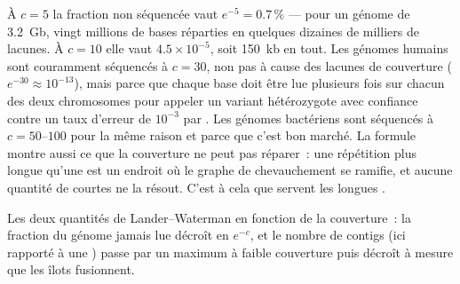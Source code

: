 \begin{example}\label{ex:b3:genomics:coverage}
À $c = 5$ la fraction non séquencée vaut $e^{-5} = 0.7\,\%$ --- pour un
génome de \qty{3.2}{Gb}, vingt millions de bases réparties en quelques
dizaines de milliers de lacunes. À $c = 10$ elle vaut
$4.5\times 10^{-5}$, soit \qty{150}{kb} en tout. Les génomes humains
sont couramment séquencés à $c = 30$, non pas à cause des lacunes de
couverture ($e^{-30} \approx 10^{-13}$), mais parce que chaque base
doit être lue plusieurs fois sur chacun des deux chromosomes pour
appeler un variant hétérozygote avec confiance contre un taux d'erreur
de $10^{-3}$ par . Les génomes bactériens sont séquencés à
$c = 50$--$100$ pour la même raison et parce que c'est bon marché. La
formule montre aussi ce que la couverture ne peut pas réparer~: une
répétition plus longue qu'une  est un endroit où le graphe de
chevauchement se ramifie, et aucune quantité de  courtes ne la
résout. C'est à cela que servent les longues .
\end{example}

\begin{omfigure}

{\small Les deux quantités de Lander--Waterman en fonction de la
couverture~: la fraction du génome jamais lue décroît en $e^{-c}$, et le
nombre de contigs (ici rapporté à une ) passe par un maximum à
faible couverture puis décroît à mesure que les îlots fusionnent.}
\end{omfigure}

